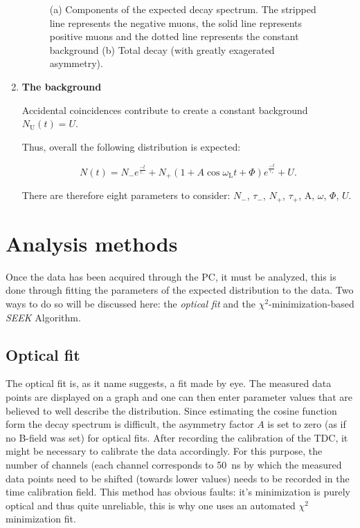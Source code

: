 \begin{enumerate}
\begin{figure}
\begin{subfigure}[t]{0.49\linewidth}
  \caption{}
\label{sfig:wigl2}
  \end{subfigure}
\caption{(a) Components of the expected decay spectrum. The stripped line represents the negative muons, the solid line represents positive muons and the dotted line represents the constant background (b) Total decay (with greatly exagerated asymmetry).}
\label{fig:wigl}
\end{figure}

\item \textbf{The background}

Accidental coincidences contribute to create a constant background $N_{\text{U}}(t)=U$.

Thus, overall the following distribution is expected:

\begin{equation}
N(t)=N_{-}e^{\frac{-t}{\tau_{-}}}+N_{+}(1+A\cos{\omega_{\text{L}}t+\Phi})e^{\frac{-t}{\tau_{+}}}+U.
\end{equation}

There are therefore eight parameters to consider: $N_{-}$, $\tau_{-}$, $N_{+}$, $\tau_{+}$, A, $\omega$, $\Phi$, $U$.

\end{enumerate}

\section{Analysis methods}

Once the data has been acquired through the PC, it must be analyzed, this is done through fitting the parameters of the expected distribution to the data. Two ways to do so will be discussed here: the \textit{optical fit} and the $\chi^2$-minimization-based \textit{SEEK} Algorithm.

\subsection{Optical fit}

The optical fit is, as it name suggests, a fit made by eye. The measured data points are displayed on a graph and one can then enter parameter values that are believed to well describe the distribution. Since estimating the cosine function form the \APmuon decay spectrum is difficult, the asymmetry factor $A$ is set to zero (as if no B-field was set) for optical fits. After recording the calibration of the TDC, it might be necessary to calibrate the data accordingly. For this purpose, the number of channels (each channel corresponds to \SI{50}{\nano\second} by which the measured data points need to be shifted (towards lower values) needs to be recorded in the time calibration field. This method has obvious faults: it's minimization is purely optical and thus quite unreliable, this is why one uses an automated $\chi^2$ minimization fit.

